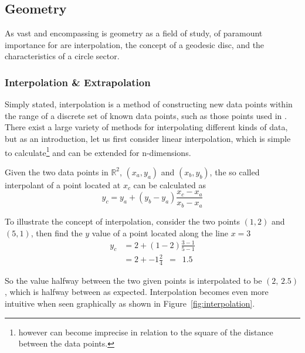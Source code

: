 %
%
%
\subsection{Geometry}
As vast and encompassing is geometry as a field of study, of paramount importance for  are interpolation, the concept of a geodesic disc, and the characteristics of a circle sector.

%
\subsubsection{Interpolation \& Extrapolation}
Simply stated, interpolation is a method of constructing new data points within the range of a discrete set of known data points, such as those points used in \tdd{}. There exist a large variety of methods for interpolating different kinds of data, but as an introduction, let us first consider linear interpolation, which is simple to calculate\footnote{however can become imprecise in relation to the square of the distance between the data points.} and can be extended for n-dimensions.

Given the two data points in $\mathbb{R}^2$, $(x_a, y_a)$ and $(x_b, y_b)$, the so called interpolant of a point located at $x_c$ can be calculated as
%
\begin{equation}
	y_c = y_a + (y_b - y_a) \frac{x_c - x_a}{x_b - x_a}
	\label{eq:interpolationGeneral}
\end{equation}

To illustrate the concept of interpolation, consider the two points $(1, 2)$ and $(5, 1)$, then find the $y$ value of a point located along the line $x = 3$
%
\begin{align}
	y_c & = 2 + (1 - 2) \frac{3 - 1}{5 - 1} \\
	& = 2 + -1 \frac{2}{4} \enspace = \enspace  1.5
	\label{eq:interpolationSpecific}
\end{align}

So the value halfway between the two given points is interpolated to be $(2,\,2.5)$, which is halfway between as expected. Interpolation becomes even more intuitive when seen graphically as shown in Figure~\ref{fig:interpolation}.

